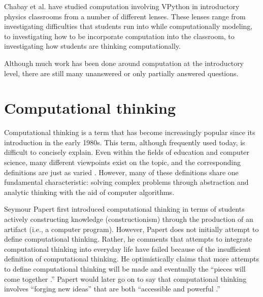 \documentclass{msuphddissertation}
\begin{document}
\begin{doublespace}
Chabay et al. have studied computation involving VPython in introductory physics classrooms from a number of different lenses.  These lenses range from investigating difficulties that students run into while computationally modeling, to investigating how to be incorporate computation into the classroom, to investigating how students are thinking computationally.

Although much work has been done around computation at the introductory level, there are still many unanswered or only partially answered questions.

\section{Computational thinking}


Computational thinking is a term that has become increasingly popular since its introduction in the early 1980s.  This term, although frequently used today, is difficult to concisely explain.  Even within the fields of education and computer science, many different viewpoints exist on the topic, and the corresponding definitions are just as varied \cite{Grover2013}.  However, many of these definitions share one fundamental characteristic: solving complex problems through abstraction and analytic thinking with the aid of computer algorithms.

Seymour Papert first introduced computational thinking in terms of students actively constructing knowledge (constructionism) through the production of an artifact (i.e., a computer program).  However, Papert does not initially attempt to define computational thinking.  Rather, he comments that attempts to integrate computational thinking into everyday life have failed because of the insufficient definition of computational thinking.  He optimistically claims that more attempts to define computational thinking will be made and eventually the ``pieces will come together \cite{Papert1981}.''  Papert would later go on to say that computational thinking involves ``forging new ideas'' that are both ``accessible and powerful \cite{Papert1996}.''


\end{doublespace}
\end{document}
